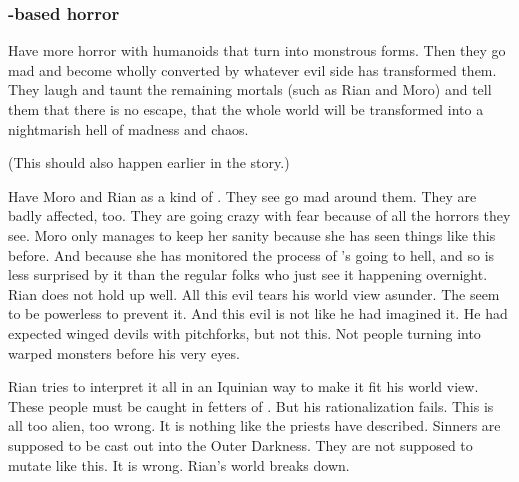 

 


\subsubsection{\Humanoid-based horror}
Have more horror with humanoids that turn into monstrous forms.
Then they go mad and become wholly converted by whatever evil side has transformed them.
They laugh and taunt the remaining mortals (such as Rian and Moro) and tell them that there is no escape, that the whole world will be transformed into a nightmarish hell of madness and chaos. 

(This should also happen earlier in the story.)

Have Moro and Rian as a kind of .
They see \Malcur go mad around them.
They are badly affected, too.
They are going crazy with fear because of all the horrors they see.
Moro only manages to keep her sanity because she has seen things like this before. 
And because she has monitored the process of \Malcur's going to hell, and so is less surprised by it than the regular folks who just see it happening overnight. 
Rian does not hold up well. 
All this evil tears his world view asunder. 
The \sephiroth seem to be powerless to prevent it. 
And this evil is not like he had imagined it.
He had expected winged devils with pitchforks, but not this. 
Not people turning into warped monsters before his very eyes. 

Rian tries to interpret it all in an Iquinian way to make it fit his world view. 
These people must be caught in fetters of \itzach. 
But his rationalization fails. 
This is all too alien, too wrong. 
It is nothing like the priests have described. 
Sinners are supposed to be cast out into the Outer Darkness. 
They are not supposed to mutate like this. 
It is wrong. 
Rian's world breaks down.

